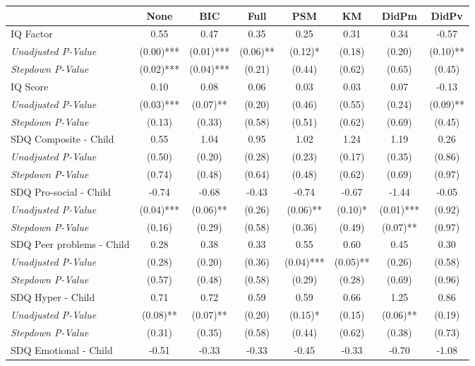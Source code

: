 \begin{tabular}{l c c c c c c c}
\toprule
 & None & BIC & Full & PSM & KM & DidPm & DidPv \\
\midrule
IQ Factor & 0.55 & 0.47 & 0.35 & 0.25 & 0.31 & 0.34 & -0.57 \\
\quad \textit{Unadjusted P-Value} & (0.00)*** & (0.01)*** & (0.06)** & (0.12)* & (0.18) & (0.20) & (0.10)** \\
\quad \textit{Stepdown P-Value} & (0.02)*** & (0.04)*** & (0.21) & (0.44) & (0.62) & (0.65) & (0.45) \\
IQ Score & 0.10 & 0.08 & 0.06 & 0.03 & 0.03 & 0.07 & -0.13 \\
\quad \textit{Unadjusted P-Value} & (0.03)*** & (0.07)** & (0.20) & (0.46) & (0.55) & (0.24) & (0.09)** \\
\quad \textit{Stepdown P-Value} & (0.13) & (0.33) & (0.58) & (0.51) & (0.62) & (0.69) & (0.45) \\
SDQ Composite - Child & 0.55 & 1.04 & 0.95 & 1.02 & 1.24 & 1.19 & 0.26 \\
\quad \textit{Unadjusted P-Value} & (0.50) & (0.20) & (0.28) & (0.23) & (0.17) & (0.35) & (0.86) \\
\quad \textit{Stepdown P-Value} & (0.74) & (0.48) & (0.64) & (0.48) & (0.62) & (0.69) & (0.97) \\
SDQ Pro-social - Child & -0.74 & -0.68 & -0.43 & -0.74 & -0.67 & -1.44 & -0.05 \\
\quad \textit{Unadjusted P-Value} & (0.04)*** & (0.06)** & (0.26) & (0.06)** & (0.10)* & (0.01)*** & (0.92) \\
\quad \textit{Stepdown P-Value} & (0.16) & (0.29) & (0.58) & (0.36) & (0.49) & (0.07)** & (0.97) \\
SDQ Peer problems - Child & 0.28 & 0.38 & 0.33 & 0.55 & 0.60 & 0.45 & 0.30 \\
\quad \textit{Unadjusted P-Value} & (0.28) & (0.20) & (0.36) & (0.04)*** & (0.05)** & (0.26) & (0.58) \\
\quad \textit{Stepdown P-Value} & (0.57) & (0.48) & (0.58) & (0.29) & (0.28) & (0.69) & (0.96) \\
SDQ Hyper - Child & 0.71 & 0.72 & 0.59 & 0.59 & 0.66 & 1.25 & 0.86 \\
\quad \textit{Unadjusted P-Value} & (0.08)** & (0.07)** & (0.20) & (0.15)* & (0.15) & (0.06)** & (0.19) \\
\quad \textit{Stepdown P-Value} & (0.31) & (0.35) & (0.58) & (0.44) & (0.62) & (0.38) & (0.73) \\
SDQ Emotional - Child & -0.51 & -0.33 & -0.33 & -0.45 & -0.33 & -0.70 & -1.08 \\

\end{tabular}
